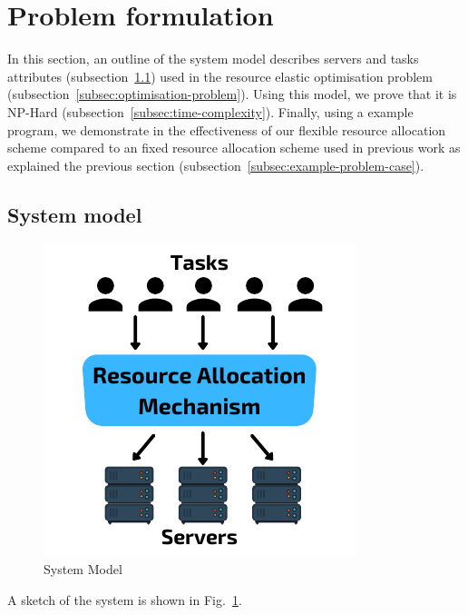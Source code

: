 \section{Problem formulation}
\label{sec:problem-formulation}
In this section, an outline of the system model describes servers and tasks attributes
(subsection~\ref{subsec:system-model}) used in the resource elastic optimisation problem
(subsection~\ref{subsec:optimisation-problem}). Using this model, we prove that it is NP-Hard
(subsection~\ref{subsec:time-complexity}). Finally, using a example program, we demonstrate in the effectiveness of our
flexible resource allocation scheme compared to an fixed resource allocation scheme used in previous work as explained
the previous section (subsection~\ref{subsec:example-problem-case}).

\subsection{System model}\label{subsec:system-model}
\begin{figure}
    \centering
    \includegraphics[width=\linewidth]{figs/system_model.pdf}
    \caption{System Model}
    \label{fig:system-model}
\end{figure}
A sketch of the system is shown in Fig.~\ref{fig:system-model}.
